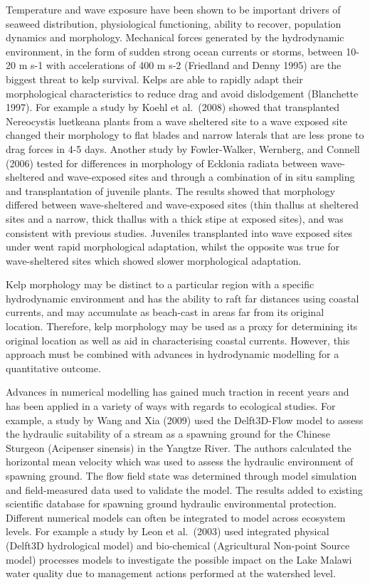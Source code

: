 \documentclass[
]{article}
\begin{document}
Temperature and wave exposure have been shown to be important drivers of
seaweed distribution, physiological functioning, ability to recover,
population dynamics and morphology. Mechanical forces generated by the
hydrodynamic environment, in the form of sudden strong ocean currents or
storms, between 10- 20 m s-1 with accelerations of 400 m s-2 (Friedland
and Denny 1995) are the biggest threat to kelp survival. Kelps are able
to rapidly adapt their morphological characteristics to reduce drag and
avoid dislodgement (Blanchette 1997). For example a study by Koehl et
al.~(2008) showed that transplanted Nereocystis luetkeana plants from a
wave sheltered site to a wave exposed site changed their morphology to
flat blades and narrow laterals that are less prone to drag forces in
4-5 days. Another study by Fowler-Walker, Wernberg, and Connell (2006)
tested for differences in morphology of Ecklonia radiata between
wave-sheltered and wave-exposed sites and through a combination of in
situ sampling and transplantation of juvenile plants. The results showed
that morphology differed between wave-sheltered and wave-exposed sites
(thin thallus at sheltered sites and a narrow, thick thallus with a
thick stipe at exposed sites), and was consistent with previous studies.
Juveniles transplanted into wave exposed sites under went rapid
morphological adaptation, whilst the opposite was true for
wave-sheltered sites which showed slower morphological adaptation.

Kelp morphology may be distinct to a particular region with a specific
hydrodynamic environment and has the ability to raft far distances using
coastal currents, and may accumulate as beach-cast in areas far from its
original location. Therefore, kelp morphology may be used as a proxy for
determining its original location as well as aid in characterising
coastal currents. However, this approach must be combined with advances
in hydrodynamic modelling for a quantitative outcome.

Advances in numerical modelling has gained much traction in recent years
and has been applied in a variety of ways with regards to ecological
studies. For example, a study by Wang and Xia (2009) used the
Delft3D-Flow model to assess the hydraulic suitability of a stream as a
spawning ground for the Chinese Sturgeon (Acipenser sinensis) in the
Yangtze River. The authors calculated the horizontal mean velocity which
was used to assess the hydraulic environment of spawning ground. The
flow field state was determined through model simulation and
field-measured data used to validate the model. The results added to
existing scientific database for spawning ground hydraulic environmental
protection. Different numerical models can often be integrated to model
across ecosystem levels. For example a study by Leon et al.~(2003) used
integrated physical (Delft3D hydrological model) and bio-chemical
(Agricultural Non-point Source model) processes models to investigate
the possible impact on the Lake Malawi water quality due to management
actions performed at the watershed level.
\end{document}
